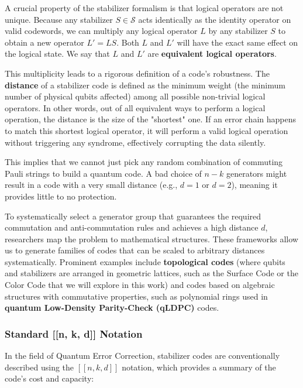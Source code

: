 A crucial property of the stabilizer formalism is that logical operators are not unique. Because any stabilizer $S \in \mathcal{S}$ acts identically as the identity operator on valid codewords, we can multiply any logical operator $L$ by any stabilizer $S$ to obtain a new operator $L' = L S$. Both $L$ and $L'$ will have the exact same effect on the logical state. We say that $L$ and $L'$ are \textbf{equivalent logical operators}.

This multiplicity leads to a rigorous definition of a code's robustness. The \textbf{distance} of a stabilizer code is defined as the minimum weight (the minimum number of physical qubits affected) among all possible non-trivial logical operators. In other words, out of all equivalent ways to perform a logical operation, the distance is the size of the "shortest" one. If an error chain happens to match this shortest logical operator, it will perform a valid logical operation without triggering any syndrome, effectively corrupting the data silently.

This implies that we cannot just pick any random combination of commuting Pauli strings to build a quantum code. A bad choice of $n-k$ generators might result in a code with a very small distance (e.g., $d=1$ or $d=2$), meaning it provides little to no protection.

To systematically select a generator group that guarantees the required commutation and anti-commutation rules and achieves a high distance $d$, researchers map the problem to mathematical structures. These frameworks allow us to generate families of codes that can be scaled to arbitrary distances systematically. Prominent examples include \textbf{topological codes} (where qubits and stabilizers are arranged in geometric lattices, such as the Surface Code or the Color Code that we will explore in this work) and codes based on algebraic structures with commutative properties, such as polynomial rings used in \textbf{quantum Low-Density Parity-Check (qLDPC)} codes.

\subsubsection{Standard [[n, k, d]] Notation}

In the field of Quantum Error Correction, stabilizer codes are conventionally described using the $[[n, k, d]]$ notation, which provides a summary of the code's cost and capacity:


